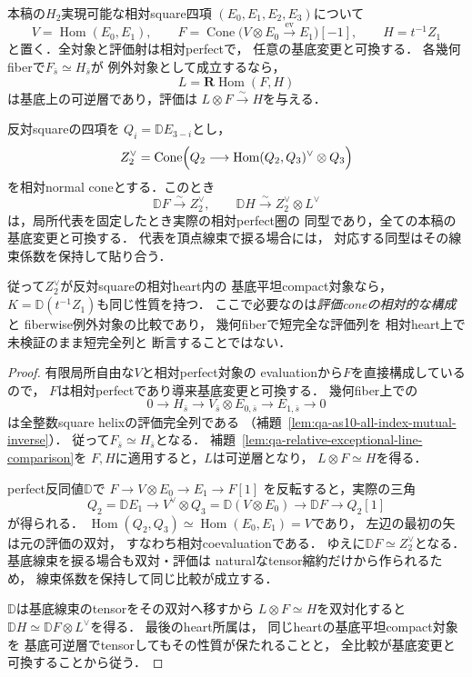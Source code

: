 \begin{lemma}[相対評価coneと逆順双対normalの実際の同定]
\label{lem:qa-dual-normal-relative-evaluation-cone}
本稿の$H_2$実現可能な相対square四項
$(E_0,E_1,E_2,E_3)$について
\[
 V=\operatorname{Hom}(E_0,E_1),\qquad
 F=\operatorname{Cone}
  \bigl(V\otimes E_0\xrightarrow{\mathrm{ev}}E_1\bigr)[-1],
 \qquad H=t^{-1}Z_1
\]
と置く．全対象と評価射は相対perfectで，
任意の基底変更と可換する．
各幾何fiberで$F_{\bar s}\simeq H_{\bar s}$が
例外対象として成立するなら，
\[
 L=\mathbf R\operatorname{Hom}(F,H)
\]
は基底上の可逆層であり，評価は
$L\otimes F\xrightarrow{\sim}H$を与える．

反対squareの四項を
$Q_i=\mathbb D E_{3-i}$とし，
\[
 Z_2^\vee=\operatorname{Cone}\Bigl(
 Q_2\longrightarrow
 \operatorname{Hom}(Q_2,Q_3)^\vee\otimes Q_3
 \Bigr)
\]
を相対normal coneとする．このとき
\[
 \mathbb D F\xrightarrow{\sim}Z_2^\vee,
 \qquad
 \mathbb D H\xrightarrow{\sim}Z_2^\vee\otimes L^\vee
 \tag{ECN}\label{eq:qa-dual-normal-relative-cone-comparison}
\]
は，局所代表を固定したとき実際の相対perfect圏の
同型であり，全ての本稿の基底変更と可換する．
代表を頂点線束で捩る場合には，
対応する同型はその線束係数を保持して貼り合う．

従って$Z_2^\vee$が反対squareの相対heart内の
基底平坦compact対象なら，
$K=\mathbb D(t^{-1}Z_1)$も同じ性質を持つ．
ここで必要なのは\emph{評価coneの相対的な構成}と
fiberwise例外対象の比較であり，
幾何fiberで短完全な評価列を
相対heart上で未検証のまま短完全列と
断言することではない．
\end{lemma}
\begin{proof}
有限局所自由な$V$と相対perfect対象の
evaluationから$F$を直接構成しているので，
$F$は相対perfectであり導来基底変更と可換する．
幾何fiber上での
\[
 0\longrightarrow H_{\bar s}
 \longrightarrow V_{\bar s}\otimes E_{0,\bar s}
 \longrightarrow E_{1,\bar s}\longrightarrow0
\]
は全整数square helixの評価完全列である
（補題~\ref{lem:qa-as10-all-index-mutual-inverse}）．
従って$F_{\bar s}\simeq H_{\bar s}$となる．
補題~\ref{lem:qa-relative-exceptional-line-comparison}を
$F,H$に適用すると，$L$は可逆層となり，
$L\otimes F\simeq H$を得る．

perfect反同値$\mathbb D$で
$F\to V\otimes E_0\to E_1\to F[1]$
を反転すると，実際の三角
\[
 Q_2=\mathbb DE_1\longrightarrow
 V^\vee\otimes Q_3=\mathbb D(V\otimes E_0)
 \longrightarrow\mathbb D F\longrightarrow Q_2[1]
\]
が得られる．
$\operatorname{Hom}(Q_2,Q_3)\simeq
 \operatorname{Hom}(E_0,E_1)=V$であり，
左辺の最初の矢は元の評価の双対，
すなわち相対coevaluationである．
ゆえに$\mathbb DF\simeq Z_2^\vee$となる．
基底線束を捩る場合も双対・評価は
naturalなtensor縮約だけから作られるため，
線束係数を保持して同じ比較が成立する．

$\mathbb D$は基底線束のtensorをその双対へ移すから
$L\otimes F\simeq H$を双対化すると
$\mathbb DH\simeq\mathbb DF\otimes L^\vee$を得る．
最後のheart所属は，
同じheartの基底平坦compact対象を
基底可逆層でtensorしてもその性質が保たれることと，
全比較が基底変更と可換することから従う．
\end{proof}

